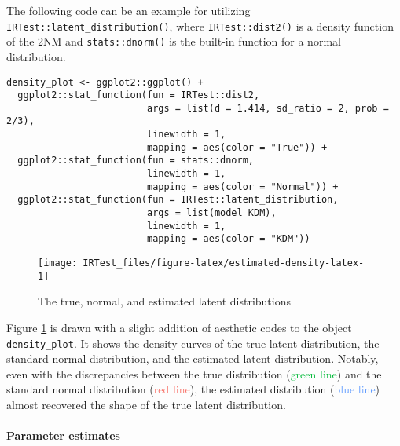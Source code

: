The following code can be an example for utilizing \texttt{IRTest::latent\_distribution()},
where \texttt{IRTest::dist2()} is a density function
of the 2NM and \texttt{stats::dnorm()} is the built-in function for a normal distribution.

\begin{verbatim}
density_plot <- ggplot2::ggplot() +
  ggplot2::stat_function(fun = IRTest::dist2,
                         args = list(d = 1.414, sd_ratio = 2, prob = 2/3),
                         linewidth = 1,
                         mapping = aes(color = "True")) +
  ggplot2::stat_function(fun = stats::dnorm,
                         linewidth = 1,
                         mapping = aes(color = "Normal")) +
  ggplot2::stat_function(fun = IRTest::latent_distribution,
                         args = list(model_KDM),
                         linewidth = 1,
                         mapping = aes(color = "KDM"))
\end{verbatim}

\begin{figure}[H]

{\centering \texttt{[image: IRTest\_files/figure-latex/estimated-density-latex-1]} 

}

\caption{The true, normal, and estimated latent distributions}\label{fig:estimated-density-latex}
\end{figure}

Figure
\ref{fig:estimated-density-latex}
is drawn with a slight addition of aesthetic codes to the object
\texttt{density\_plot}. It shows the density curves of the true latent distribution, the standard normal
distribution, and the estimated latent distribution. Notably, even with the
discrepancies between the true distribution
(\textcolor[HTML]{00BA38}{green line})
and the standard normal distribution
(\textcolor[HTML]{F8766D}{red line}),
the estimated distribution
(\textcolor[HTML]{619CFF}{blue line})
almost recovered the shape of the true latent distribution.

\hypertarget{parameter-estimates}{%
\paragraph{Parameter estimates}\label{parameter-estimates}}


